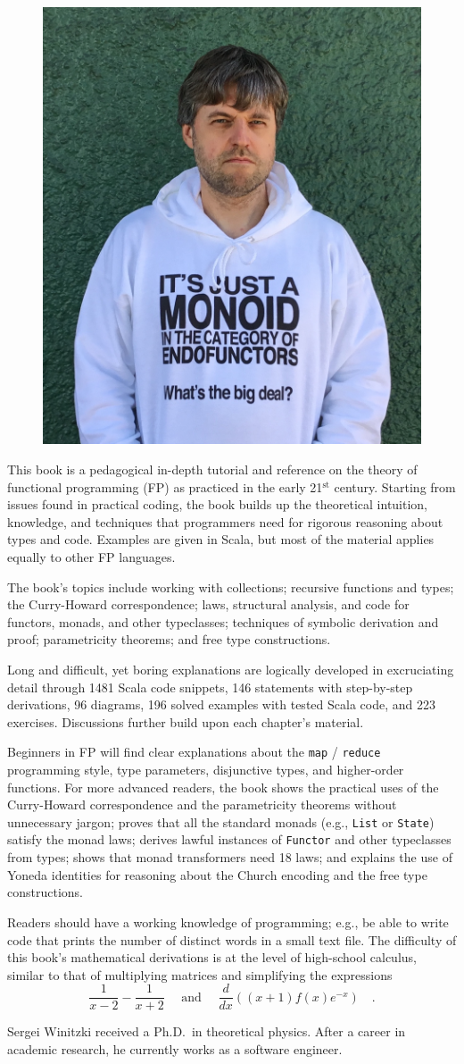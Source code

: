 \documentclass{scrartcl}
\begin{document}
\begin{figure}
\includegraphics[width=0.312\columnwidth]{zloe-lico-monad.jpg}
\vspace{-2.4\baselineskip}
\end{figure}

\noindent
\large
This book is a pedagogical in-depth tutorial and reference
on the theory of functional programming (FP) as practiced in the early
21$^{\text{st}}$ century. Starting from issues found in practical
coding, the book builds up the theoretical intuition, knowledge, and
techniques that programmers need for rigorous reasoning about types
and code. Examples are given in Scala, but most of the material applies equally
to other FP languages.

The book's topics include working with collections; recursive
functions and types; the Curry-Howard correspondence; laws, structural
analysis, and code for functors, monads, and other typeclasses; techniques
of symbolic derivation and proof; parametricity theorems; and free
type constructions.

Long and difficult, yet boring explanations are logically
developed in excruciating detail through 1481
Scala code snippets, 146 statements with step-by-step
derivations, 96 diagrams, 196 solved examples
with tested Scala code, and 223 exercises. Discussions
further build upon each chapter's material.

Beginners in FP will find clear explanations about the \texttt{map} / \texttt{reduce}
programming style, type parameters, disjunctive types, and higher-order
functions. For more advanced readers, the book shows  the practical
uses of the Curry-Howard correspondence and the parametricity theorems
without unnecessary jargon; proves that all the standard monads (e.g.,
\texttt{List} or \texttt{State})
satisfy the monad laws; derives lawful instances of \texttt{Functor}
and other typeclasses from types; shows that monad transformers need
18 laws; and explains the use of Yoneda identities for reasoning about
the Church encoding and the free type constructions.

Readers should have a working knowledge of programming; e.g.,
be able to write code that prints the number of distinct words in
a small text file. The difficulty of this book's mathematical derivations
is at the level of high-school calculus, similar to that of multiplying
matrices and simplifying the expressions
\[
\frac{1}{x-2}-\frac{1}{x+2}\quad\text{ and }\quad\frac{d}{dx}\left((x+1)f(x)e^{-x}\right)\quad.
\]

Sergei Winitzki received a Ph.D. in theoretical physics. After a career in academic research, he currently works as a software engineer.
\end{document}
